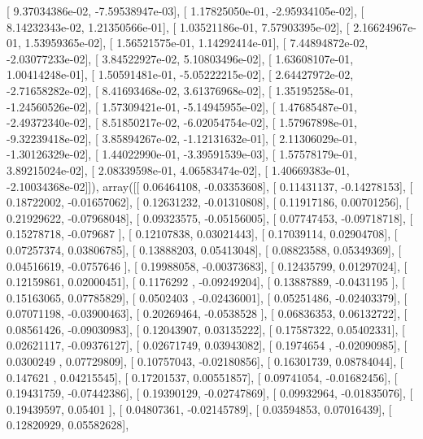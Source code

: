\documentclass{article}
\begin{document}
       [  9.37034386e-02,  -7.59538947e-03],
       [  1.17825050e-01,  -2.95934105e-02],
       [  8.14232343e-02,   1.21350566e-01],
       [  1.03521186e-01,   7.57903395e-02],
       [  2.16624967e-01,   1.53959365e-02],
       [  1.56521575e-01,   1.14292414e-01],
       [  7.44894872e-02,  -2.03077233e-02],
       [  3.84522927e-02,   5.10803496e-02],
       [  1.63608107e-01,   1.00414248e-01],
       [  1.50591481e-01,  -5.05222215e-02],
       [  2.64427972e-02,  -2.71658282e-02],
       [  8.41693468e-02,   3.61376968e-02],
       [  1.35195258e-01,  -1.24560526e-02],
       [  1.57309421e-01,  -5.14945955e-02],
       [  1.47685487e-01,  -2.49372340e-02],
       [  8.51850217e-02,  -6.02054754e-02],
       [  1.57967898e-01,  -9.32239418e-02],
       [  3.85894267e-02,  -1.12131632e-01],
       [  2.11306029e-01,  -1.30126329e-02],
       [  1.44022990e-01,  -3.39591539e-03],
       [  1.57578179e-01,   3.89215024e-02],
       [  2.08339598e-01,   4.06583474e-02],
       [  1.40669383e-01,  -2.10034368e-02]]), array([[ 0.06464108, -0.03353608],
       [ 0.11431137, -0.14278153],
       [ 0.18722002, -0.01657062],
       [ 0.12631232, -0.01310808],
       [ 0.11917186,  0.00701256],
       [ 0.21929622, -0.07968048],
       [ 0.09323575, -0.05156005],
       [ 0.07747453, -0.09718718],
       [ 0.15278718, -0.079687  ],
       [ 0.12107838,  0.03021443],
       [ 0.17039114,  0.02904708],
       [ 0.07257374,  0.03806785],
       [ 0.13888203,  0.05413048],
       [ 0.08823588,  0.05349369],
       [ 0.04516619, -0.0757646 ],
       [ 0.19988058, -0.00373683],
       [ 0.12435799,  0.01297024],
       [ 0.12159861,  0.02000451],
       [ 0.1176292 , -0.09249204],
       [ 0.13887889, -0.0431195 ],
       [ 0.15163065,  0.07785829],
       [ 0.0502403 , -0.02436001],
       [ 0.05251486, -0.02403379],
       [ 0.07071198, -0.03900463],
       [ 0.20269464, -0.0538528 ],
       [ 0.06836353,  0.06132722],
       [ 0.08561426, -0.09030983],
       [ 0.12043907,  0.03135222],
       [ 0.17587322,  0.05402331],
       [ 0.02621117, -0.09376127],
       [ 0.02671749,  0.03943082],
       [ 0.1974654 , -0.02090985],
       [ 0.0300249 ,  0.07729809],
       [ 0.10757043, -0.02180856],
       [ 0.16301739,  0.08784044],
       [ 0.147621  ,  0.04215545],
       [ 0.17201537,  0.00551857],
       [ 0.09741054, -0.01682456],
       [ 0.19431759, -0.07442386],
       [ 0.19390129, -0.02747869],
       [ 0.09932964, -0.01835076],
       [ 0.19439597,  0.05401   ],
       [ 0.04807361, -0.02145789],
       [ 0.03594853,  0.07016439],
       [ 0.12820929,  0.05582628],
\end{document}
